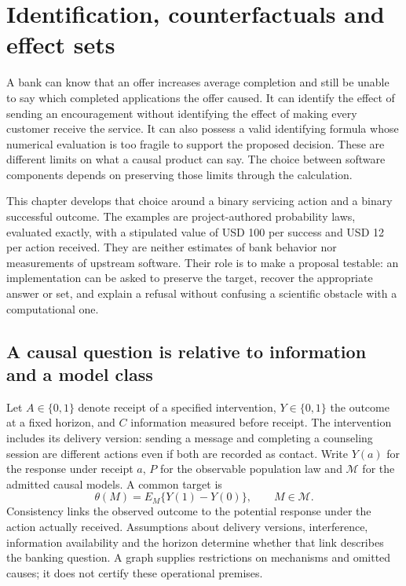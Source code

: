 \chapter{Identification, counterfactuals and effect sets}
\label{exec17:s3}

A bank can know that an offer increases average completion and still be unable
to say which completed applications the offer caused. It can identify the
effect of sending an encouragement without identifying the effect of making
every customer receive the service. It can also possess a valid identifying
formula whose numerical evaluation is too fragile to support the proposed
decision. These are different limits on what a causal product can say. The
choice between software components depends on preserving those limits through
the calculation.

This chapter develops that choice around a binary servicing action and a
binary successful outcome. The examples are project-authored probability
laws, evaluated exactly, with a stipulated value of USD 100 per success and
USD 12 per action received. They are neither estimates of bank behavior nor
measurements of upstream software. Their role is to make a proposal testable:
an implementation can be asked to preserve the target, recover the
appropriate answer or set, and explain a refusal without confusing a
scientific obstacle with a computational one.\citep{exec17_s3_exact}

\section{A causal question is relative to information and a model class}
\label{exec17:s3-target}

Let $A\in\{0,1\}$ denote receipt of a specified intervention, $Y\in\{0,1\}$
the outcome at a fixed horizon, and $C$ information measured before receipt.
The intervention includes its delivery version: sending a message and
completing a counseling session are different actions even if both are
recorded as contact. Write $Y(a)$ for the response under receipt $a$,
$P$ for the observable population law and $\mathcal M$ for the admitted
causal models. A common target is
\[
 \theta(M)=E_M\{Y(1)-Y(0)\},\qquad M\in\mathcal M.
\]
Consistency links the observed outcome to the potential response under
the action actually received. Assumptions about delivery versions,
interference, information availability and the horizon determine whether
that link describes the banking question. A graph supplies restrictions
on mechanisms and omitted causes; it does not certify these operational
premises.\citep{pearl2009,swig2013}

